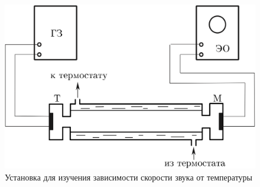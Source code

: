 \documentclass[a4paper,12pt]{article} %
\begin{document}
\begin{figure}[h!]
    \centering
    \includegraphics[width=\textwidth]{установка2.png}
    \caption{Установка для изучения зависимости скорости звука от температуры}\label{setup}
	\label{setup2}
\end{figure}



\end{document}
